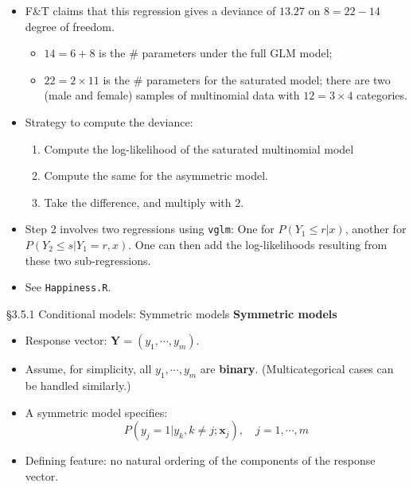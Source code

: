 \documentclass{beamer}
\newenvironment{wideitemize}%
  {\begin{itemize}%
    \setlength{\parskip}{1em}}%
  {\end{itemize}}
\begin{document}
\begin{frame} { }
\begin{wideitemize}

\item  F\&T claims that this regression gives a deviance of $13.27$ on $8 = 22 - 14$ degree of freedom.
\begin{itemize}
\item  $14 = 6 +8$ is the  \#  parameters under the full GLM model; 
\item $22 = 2 \times 11$ is the  \# parameters for the saturated model; there are two (male and female)  samples of multinomial data with $12 = 3 \times 4$ categories.
 \end{itemize}
\item Strategy to compute the deviance:
\begin{enumerate}
\item Compute the log-likelihood of the saturated multinomial model 

\item Compute the same for the asymmetric model. 

\item Take the difference, and multiply with $2$. 
\end{enumerate}
\item Step 2 involves two regressions using \texttt{vglm}: One for $P(Y_1 \leq r |x ) $, another for $P(Y_2 \leq s |Y_1 = r, x ) $. One  can then add the log-likelihoods resulting from these two sub-regressions. 
\item 
See \texttt{Happiness.R}.
\end{wideitemize}




\end{frame}



\begin{frame}{\S3.5.1 Conditional models: Symmetric models}
\textbf{Symmetric models}
\begin{itemize}
\item
Response vector: $\textbf{Y}=(y_1,\cdots, y_m)$.
\item
Assume, for simplicity, all $y_1,\cdots, y_m$ are \textbf{binary}. (Multicategorical cases can be handled similarly.)
\item
A symmetric model specifies:
\begin{equation}
P(y_j=1|y_k, k\neq j; \textbf{x}_j), \quad  j=1,\cdots, m
\label{eq-3.5.4}
\end{equation}
\item 
Defining feature: no natural ordering of the components of the response vector. 
\end{itemize}
\end{frame}
\end{document}
